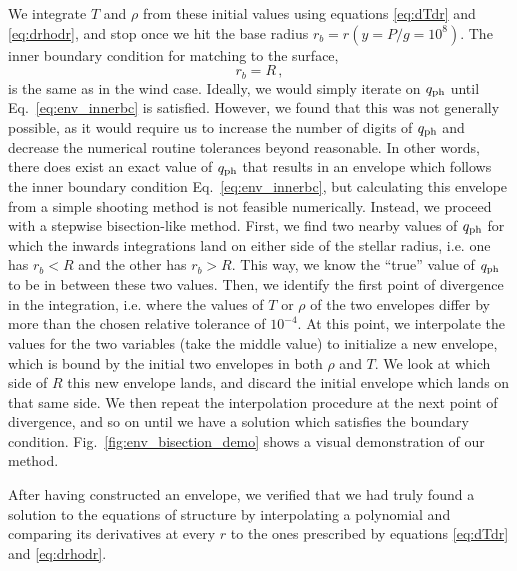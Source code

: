 \documentclass[../main.tex]{subfiles}
\begin{document}
We integrate $T$ and $\rho$ from these initial values using equations \eqref{eq:dTdr} and \eqref{eq:drhodr}, and stop once we hit the base radius $r_b=r(y=P/g=10^8)$. The inner boundary condition for matching to the surface,
\begin{equation}\label{eq:env_innerbc}
    r_b=R\,,
\end{equation}
is the same as in the wind case. Ideally, we would simply iterate on $q_\text{ph}$ until Eq.~\eqref{eq:env_innerbc} is satisfied. However, we found that this was not generally possible, as it would require us to increase the number of digits of $q_\text{ph}$ and decrease the numerical routine tolerances beyond reasonable. In other words, there does exist an exact value of $q_\text{ph}$ that results in an envelope which follows the inner boundary condition Eq.~\eqref{eq:env_innerbc}, but calculating this envelope from a simple shooting method is not feasible numerically. Instead, we proceed with a stepwise bisection-like method. First, we find two nearby values of $q_\text{ph}$  for which the inwards integrations land on either side of the stellar radius, i.e. one has $r_b<R$ and the other has $r_b>R$. This way, we know the ``true'' value of $q_\text{ph}$ to be in between these two values. Then, we identify the first point of divergence in the integration, i.e. where the values of $T$ or $\rho$ of the two envelopes differ by more than the chosen relative tolerance of $10
^{-4}$. At this point, we interpolate the values for the two variables (take the middle value) to initialize a new envelope, which is bound by the initial two envelopes in both $\rho$ and $T$. We look at which side of $R$ this new envelope lands, and discard the initial envelope which lands on that same side. We then repeat the interpolation procedure at the next point of divergence, and so on until we have a solution which satisfies the boundary condition. Fig.~\ref{fig:env_bisection_demo} shows a visual demonstration of our method. 

After having constructed an envelope, we verified that we had truly found a solution to the equations of structure by interpolating a polynomial and comparing its derivatives at every $r$ to the ones prescribed by equations \eqref{eq:dTdr} and \eqref{eq:drhodr}.
\end{document}
